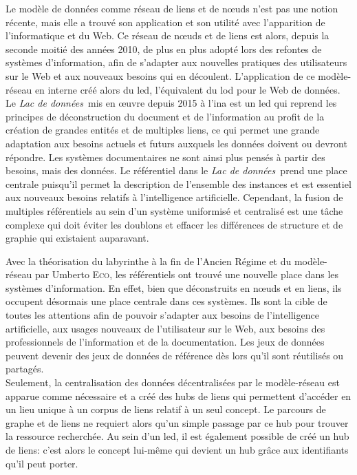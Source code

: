 \documentclass[a4paper,12pt,twoside]{book}
\newcommand{\ldd}{\textit{Lac de données~}}
\newcommand{\nP}[2]{#1 \textsc{#2}}
\begin{document}
	Le modèle de données comme réseau de liens et de nœuds n'est pas une notion récente, mais elle a trouvé son application et son utilité avec l'apparition de l'informatique et du Web. Ce réseau de nœuds et de liens est alors, depuis la seconde moitié des années 2010, de plus en plus adopté lors des refontes de systèmes d'information, afin de s'adapter aux nouvelles pratiques des utilisateurs sur le Web et aux nouveaux besoins qui en découlent. L'application de ce modèle-réseau en interne créé alors du \ac{led}, l'équivalent du \ac{lod} pour le Web de données.\\
	
	Le \ldd mis en œuvre depuis 2015 à l'\ac{ina} est un \ac{led} qui reprend les principes de déconstruction du document et de l'information au profit de la création de grandes entités et de multiples liens, ce qui permet une grande adaptation aux besoins actuels et futurs auxquels les données doivent ou devront répondre. Les systèmes documentaires ne sont ainsi plus pensés à partir des besoins, mais des données. Le référentiel dans le \ldd prend une place centrale puisqu'il permet la description de l'ensemble des instances et est essentiel aux nouveaux besoins relatifs à l'intelligence artificielle. Cependant, la fusion de multiples référentiels au sein d'un système uniformisé et centralisé est une tâche complexe qui doit éviter les doublons et effacer les différences de structure et de graphie qui existaient auparavant.
	
	
	
	
	
	\newpage
	
	Avec la théorisation du labyrinthe à la fin de l'Ancien Régime et du modèle-réseau par \nP{Umberto}{Eco}, les référentiels ont trouvé une nouvelle place dans les systèmes d'information. En effet, bien que déconstruits en nœuds et en liens, ils occupent désormais une place centrale dans ces systèmes. Ils sont la cible de toutes les attentions afin de pouvoir s'adapter aux besoins de l'intelligence artificielle, aux usages nouveaux de l'utilisateur sur le Web, aux besoins des professionnels de l'information et de la documentation. Les jeux de données peuvent devenir des jeux de données de référence dès lors qu'il sont réutilisés ou partagés.\\
	
	Seulement, la centralisation des données décentralisées par le modèle-réseau est apparue comme nécessaire et a créé des hubs de liens qui permettent d'accéder en un lieu unique à un corpus de liens relatif à un seul concept. Le parcours de graphe et de liens ne requiert alors qu'un simple passage par ce hub pour trouver la ressource recherchée. Au sein d'un \ac{led}, il est également possible de créé un hub de liens: c'est alors le concept lui-même qui devient un hub grâce aux identifiants qu'il peut porter.\\
	
\end{document}
